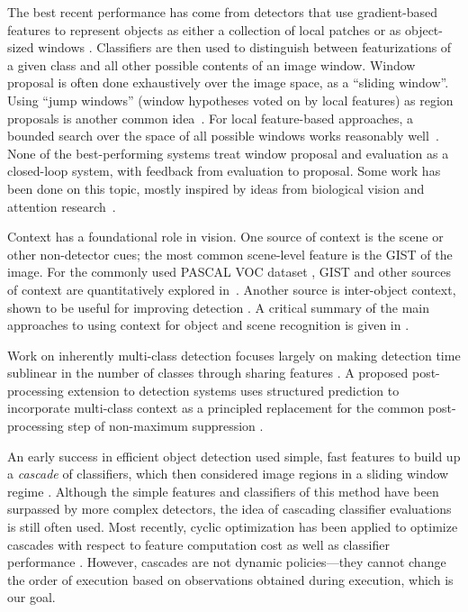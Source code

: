 The best recent performance has come from detectors that use gradient-based features to represent objects as either a collection of local patches or as object-sized windows \cite{Dalal2005,Lowe2004}.
Classifiers are then used to distinguish between featurizations of a given class and all other possible contents of an image window.
%
Window proposal is often done exhaustively over the image space, as a ``sliding window''.
Using ``jump windows'' (window hypotheses voted on by local features) as region proposals is another common idea~\cite{Vedaldi2009,Vijayanarasimhan2011}.
For local feature-based approaches, a bounded search over the space of all possible windows works reasonably well~\cite{Lampert2008a}.
%
None of the best-performing systems treat window proposal and evaluation as a closed-loop system, with feedback from evaluation to proposal.
Some work has been done on this topic, mostly inspired by ideas from biological vision and attention research~\cite{Butko2009,Vogel2008}.

Context has a foundational role in vision.
One source of context is the scene or other non-detector cues; the most common scene-level feature is the GIST \cite{Oliva2001a} of the image.
For the commonly used PASCAL VOC dataset \cite{pascal-voc-2010}, GIST and other sources of context are quantitatively explored in~\cite{Divvala2009}. 
%
Another source is inter-object context, shown to be useful for improving detection \cite{Torralba2004}.
A critical summary of the main approaches to using context for object and scene recognition is given in \cite{Galleguillos2010}.

Work on inherently multi-class detection focuses largely on making detection time sublinear in the number of classes through sharing features \cite{Torralba2007,Fan2005}.
A proposed post-processing extension to detection systems uses structured prediction to incorporate multi-class context as a principled replacement for the common post-processing step of non-maximum suppression \cite{Desai2009}.

An early success in efficient object detection used simple, fast features to build up a \emph{cascade} of classifiers, which then considered image regions in a sliding window regime \cite{Viola2001}.
Although the simple features and classifiers of this method have been surpassed by more complex detectors, the idea of cascading classifier evaluations is still often used.
Most recently, cyclic optimization has been applied to optimize cascades with respect to feature computation cost as well as classifier performance \cite{Chen2012}.
However, cascades are not dynamic policies---they cannot change the order of execution based on observations obtained during execution, which is our goal.

